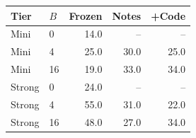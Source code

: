\begin{tabular}{llrrr}
\toprule
Tier & $B$ & Frozen & Notes & +Code \\
\midrule
Mini & 0 & 14.0 & -- & -- \\
Mini & 4 & 25.0 & 30.0 & 25.0 \\
Mini & 16 & 19.0 & 33.0 & 34.0 \\
Strong & 0 & 24.0 & -- & -- \\
Strong & 4 & 55.0 & 31.0 & 22.0 \\
Strong & 16 & 48.0 & 27.0 & 34.0 \\
\bottomrule
\end{tabular}
